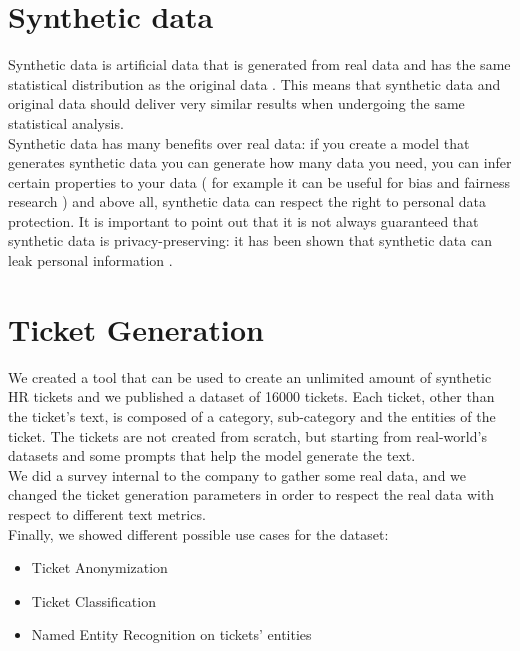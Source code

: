 \section{Synthetic data}
Synthetic data is artificial data that is generated from real data and has the same statistical distribution as the original data . This means that synthetic data and original data should deliver very similar results when undergoing the same statistical analysis. \\
Synthetic data has many benefits over real data: if you create a model that generates synthetic data you can generate how many data you need, you can infer certain properties to your data ( for example it can be useful for bias and fairness research ) and above all, synthetic data can respect the right to personal data protection. It is important to point out that it is not always guaranteed that synthetic data is privacy-preserving: it has been shown that synthetic data can leak personal information \cite{bellovin2019privacy}.\\

\section{Ticket Generation}
We created a tool that can be used to create an unlimited amount of synthetic HR tickets and we published a dataset of 16000 tickets. Each ticket, other than the ticket's text, is composed of a category, sub-category and the entities of the ticket. The tickets are not created from scratch, but starting from real-world's datasets and some prompts that help the model generate the text. \\
We did a survey internal to the company to gather some real data, and we changed the ticket generation parameters in order to respect the real data with respect to different text metrics. \\
Finally, we showed different possible use cases for the dataset:
\begin{itemize}
    \item Ticket Anonymization
    \item Ticket Classification
    \item Named Entity Recognition on tickets' entities
\end{itemize}